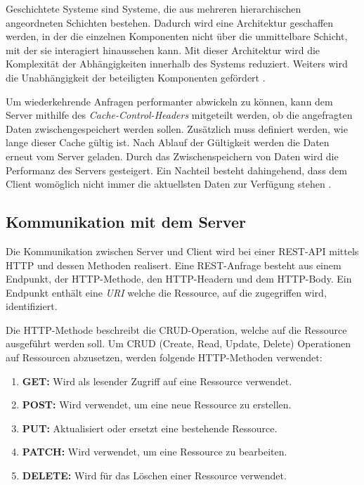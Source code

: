 Geschichtete Systeme sind Systeme, die aus mehreren hierarchischen angeordneten Schichten bestehen.
Dadurch wird eine Architektur geschaffen werden, in der die einzelnen Komponenten nicht über die unmittelbare Schicht, mit der sie interagiert hinaussehen kann.
Mit dieser Architektur wird die Komplexität der Abhängigkeiten innerhalb des Systems reduziert.
Weiters wird die Unabhängigkeit der beteiligten Komponenten gefördert \parencite[S. 79]{fielding2000architectural}.

Um wiederkehrende Anfragen performanter abwickeln zu können, kann dem Server mithilfe des \textit{Cache-Control-Headers} mitgeteilt werden, ob die angefragten Daten zwischengespeichert werden sollen.
Zusätzlich muss definiert werden, wie lange dieser Cache gültig ist.
Nach Ablauf der Gültigkeit werden die Daten erneut vom Server geladen.
Durch das Zwischenspeichern von Daten wird die Performanz des Servers gesteigert.
Ein Nachteil besteht dahingehend, dass dem Client womöglich nicht immer die aktuellsten Daten zur Verfügung stehen \parencite[S. 79]{fielding2000architectural}.

\subsection{Kommunikation mit dem Server}
Die Kommunikation zwischen Server und Client wird bei einer REST-API mittels HTTP und dessen Methoden realisert.
Eine REST-Anfrage besteht aus einem Endpunkt, der HTTP-Methode, den HTTP-Headern und dem HTTP-Body.
Ein Endpunkt enthält eine \textit{URI} welche die Ressource, auf die zugegriffen wird, identifiziert.
\newline

Die HTTP-Methode beschreibt die CRUD-Operation, welche auf die Ressource ausgeführt werden soll.
Um CRUD (Create, Read, Update, Delete) Operationen auf Ressourcen abzusetzen, werden folgende HTTP-Methoden verwendet:
\begin{enumerate}
    \item \textbf{GET: }Wird als lesender Zugriff auf eine Ressource verwendet.
    \item \textbf{POST: }Wird verwendet, um eine neue Ressource zu erstellen.
    \item \textbf{PUT: }Aktualisiert oder ersetzt eine bestehende Ressource.
    \item \textbf{PATCH: }Wird verwendet, um eine Ressource zu bearbeiten.
    \item \textbf{DELETE: }Wird für das Löschen einer Ressource verwendet.
\end{enumerate}


